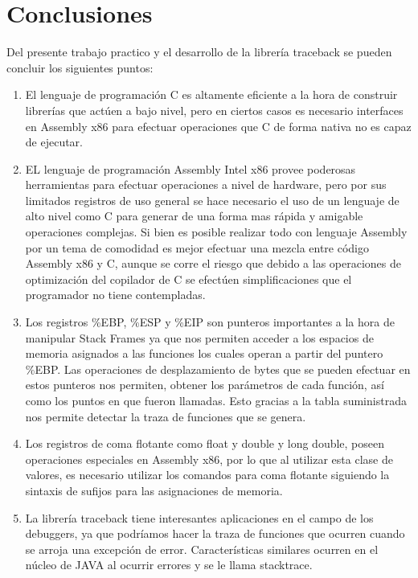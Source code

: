 \documentclass[twocolumn,11pts]{IEEEtran}
\begin{document}
\section{Conclusiones}
Del presente trabajo practico y el desarrollo de la librería traceback se pueden concluir los siguientes puntos:\\
\begin{enumerate}
\item El lenguaje de programación C es altamente eficiente a la hora de construir librerías que actúen a bajo nivel, pero en ciertos casos es necesario interfaces en Assembly x86 para efectuar operaciones que C de forma nativa no es capaz de ejecutar.
\item EL lenguaje de programación Assembly Intel x86 provee poderosas herramientas para efectuar operaciones a nivel de hardware, pero por sus limitados registros de uso general se hace necesario el uso de un lenguaje de alto nivel como C para generar de una forma mas rápida y amigable operaciones complejas. Si bien es posible realizar todo con lenguaje Assembly por un tema de comodidad es mejor efectuar una mezcla entre código Assembly x86 y C, aunque se corre el riesgo que debido a las operaciones de optimización del copilador de C se efectúen simplificaciones que el programador no tiene contempladas.
\item Los registros \%EBP, \%ESP y \%EIP son punteros importantes a la hora de manipular Stack Frames ya que nos permiten acceder a los espacios de memoria asignados a las funciones los cuales operan a partir del puntero \%EBP. Las operaciones de desplazamiento de bytes que se pueden efectuar en estos punteros nos permiten, obtener los parámetros de cada función, así como los puntos en que fueron llamadas. Esto gracias a la tabla suministrada nos permite detectar la traza de funciones que se genera.
\item Los registros de coma flotante como float y double y long double, poseen operaciones especiales en Assembly x86, por lo que al utilizar esta clase de valores, es necesario utilizar los comandos para coma flotante siguiendo la sintaxis de sufijos para las asignaciones de memoria.
\item La librería traceback tiene interesantes aplicaciones en el campo de los debuggers, ya que podríamos hacer la traza de funciones que ocurren cuando se arroja una excepción de error. Características similares ocurren en el núcleo de JAVA al ocurrir errores y se le llama stacktrace.
\end{enumerate}
\end{document}
